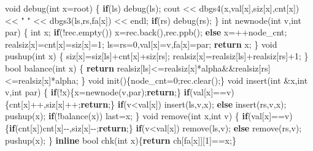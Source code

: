 \documentclass[
]{article}
\newenvironment{Shaded}{}{}
\newcommand{\ControlFlowTok}[1]{\textcolor[rgb]{0.00,0.44,0.13}{\textbf{#1}}}
\newcommand{\DataTypeTok}[1]{\textcolor[rgb]{0.56,0.13,0.00}{#1}}
\newcommand{\DecValTok}[1]{\textcolor[rgb]{0.25,0.63,0.44}{#1}}
\newcommand{\KeywordTok}[1]{\textcolor[rgb]{0.00,0.44,0.13}{\textbf{#1}}}
\newcommand{\NormalTok}[1]{#1}
\newcommand{\StringTok}[1]{\textcolor[rgb]{0.25,0.44,0.63}{#1}}
\begin{document}
\begin{Shaded}
\begin{Highlighting}[]
    \DataTypeTok{void}\NormalTok{ debug(}\DataTypeTok{int}\NormalTok{ x=root)}
\NormalTok{    \{}
        \ControlFlowTok{if}\NormalTok{(ls) debug(ls);}
\NormalTok{        cout \textless{}\textless{} dbgs4(x,val[x],siz[x],cnt[x]) \textless{}\textless{} }\StringTok{" "}\NormalTok{  \textless{}\textless{} dbgs3(ls,rs,fa[x]) \textless{}\textless{} endl;}
        \ControlFlowTok{if}\NormalTok{(rs) debug(rs);}
\NormalTok{    \}}
    \DataTypeTok{int}\NormalTok{ newnode(}\DataTypeTok{int}\NormalTok{ v,}\DataTypeTok{int}\NormalTok{ par)}
\NormalTok{    \{}
        \DataTypeTok{int}\NormalTok{ x;}
        \ControlFlowTok{if}\NormalTok{(!rec.empty()) x=rec.back(),rec.ppb();}
        \ControlFlowTok{else}\NormalTok{ x=++node\_cnt;}
\NormalTok{        realsiz[x]=cnt[x]=siz[x]=}\DecValTok{1}\NormalTok{;}
\NormalTok{        ls=rs=}\DecValTok{0}\NormalTok{,val[x]=v,fa[x]=par;}
        \ControlFlowTok{return}\NormalTok{ x;}
\NormalTok{    \}}
    \DataTypeTok{void}\NormalTok{ pushup(}\DataTypeTok{int}\NormalTok{ x)}
\NormalTok{    \{}
\NormalTok{        siz[x]=siz[ls]+cnt[x]+siz[rs];}
\NormalTok{        realsiz[x]=realsiz[ls]+realsiz[rs]+}\DecValTok{1}\NormalTok{;}
\NormalTok{    \}}
    \DataTypeTok{bool}\NormalTok{ balance(}\DataTypeTok{int}\NormalTok{ x)}
\NormalTok{    \{}
        \ControlFlowTok{return}\NormalTok{ realsiz[ls]\textless{}=realsiz[x]*alpha\&\&realsiz[rs]\textless{}=realsiz[x]*alpha;}
\NormalTok{    \}}
    \DataTypeTok{void}\NormalTok{ init()\{node\_cnt=}\DecValTok{0}\NormalTok{;rec.clear();\}}
    \DataTypeTok{void}\NormalTok{ insert(}\DataTypeTok{int}\NormalTok{ \&x,}\DataTypeTok{int}\NormalTok{ v,}\DataTypeTok{int}\NormalTok{ par)}
\NormalTok{    \{}
        \ControlFlowTok{if}\NormalTok{(!x)\{x=newnode(v,par);}\ControlFlowTok{return}\NormalTok{;\}}
        \ControlFlowTok{if}\NormalTok{(val[x]==v)\{cnt[x]++,siz[x]++;}\ControlFlowTok{return}\NormalTok{;\}}
        \ControlFlowTok{if}\NormalTok{(v\textless{}val[x]) insert(ls,v,x);}
        \ControlFlowTok{else}\NormalTok{ insert(rs,v,x);}
\NormalTok{        pushup(x); }\ControlFlowTok{if}\NormalTok{(!balance(x)) last=x;}
\NormalTok{    \}}
    \DataTypeTok{void}\NormalTok{ remove(}\DataTypeTok{int}\NormalTok{ x,}\DataTypeTok{int}\NormalTok{ v)}
\NormalTok{    \{}
        \ControlFlowTok{if}\NormalTok{(val[x]==v)\{}\ControlFlowTok{if}\NormalTok{(cnt[x])cnt[x]{-}{-},siz[x]{-}{-};}\ControlFlowTok{return}\NormalTok{;\}}
        \ControlFlowTok{if}\NormalTok{(v\textless{}val[x]) remove(ls,v);}
        \ControlFlowTok{else}\NormalTok{ remove(rs,v);}
\NormalTok{        pushup(x);}
\NormalTok{    \}}
    \KeywordTok{inline} \DataTypeTok{bool}\NormalTok{ chk(}\DataTypeTok{int}\NormalTok{ x)\{}\ControlFlowTok{return}\NormalTok{ ch[fa[x]][}\DecValTok{1}\NormalTok{]==x;\}}

\end{Highlighting}
\end{Shaded}
\end{document}
